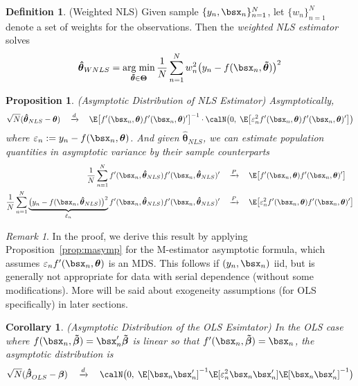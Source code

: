 \documentclass[12pt]{article}
\theoremstyle{plain}
\newtheorem{prop}[thm]{Proposition}
\newtheorem{cor}[thm]{Corollary}
\theoremstyle{definition}
\newtheorem{defn}[thm]{Definition}
\theoremstyle{remark}
\newtheorem*{rmk}{Remark}
\newcommand{\bstheta}{\boldsymbol{\theta}}
\newcommand{\bsTheta}{\boldsymbol{\Theta}}
\newcommand{\bsbeta}{\boldsymbol{\beta}}
\newcommand{\bshatbeta}{\boldsymbol{\hat{\beta}}}
\newcommand{\bshattheta}{\boldsymbol{\hat{\theta}}}
\newcommand{\bstildebeta}{\boldsymbol{\tilde{\beta}}}
\newcommand{\bstildetheta}{\boldsymbol{\tilde{\theta}}}
\DeclareMathOperator*{\argmin}{arg\;min}
\newcommand{\Var}{\operatorname{Var}}
\newcommand{\pto}{\xrightarrow{P}}
\newcommand{\dto}{\xrightarrow{d}}
\newcommand{\sumnN}{\sum^N_{n=1}}
\newcommand{\nN}{_{n=1}^N}
\begin{document}
\begin{defn}(Weighted NLS)
Given sample $\{y_n,\bsx_n\}\nN$, let $\{w_n\}\nN$ denote a set of
weights for the observations. Then the \emph{weighted NLS estimator}
solves
\begin{align}
  \bshattheta_{WNLS}
  = \argmin_{\bstildetheta\in\bsTheta}
  \frac{1}{N}\sumnN w_n^2\big(y_n-f(\bsx_n,\bstildetheta)\big)^2
  \label{wnls}
\end{align}
\end{defn}


\begin{prop}\emph{(Asymptotic Distribution of NLS Estimator)}
\label{prop:nls}
Asymptotically,
\begin{align*}
  \sqrt{N}(\bshattheta_{NLS}-\bstheta)
  \quad\dto\quad
  \E\big[
  f'(\bsx_n,\bstheta)f'(\bsx_n,\bstheta)'
  \big]^{-1}
  \cdot
  \calN\big(0,\;
  \E\big[\varepsilon_n^2f'(\bsx_n,\bstheta)f'(\bsx_n,\bstheta)'\big]
  \big)
\end{align*}
where $\varepsilon_n:=y_n-f(\bsx_n,\bstheta)$.
And given $\bshattheta_{NLS}$, we can estimate population quantities in
asymptotic variance by their sample counterparts
\begin{align*}
  \frac{1}{N}\sumnN
  f'(\bsx_n,\bshattheta_{NLS})f'(\bsx_n,\bshattheta_{NLS})'
  \quad&\pto\quad
  \E\big[
  f'(\bsx_n,\bstheta)f'(\bsx_n,\bstheta)'
  \big]
  \\
  \frac{1}{N}\sumnN
  \underbrace{%
  \big(y_n-f(\bsx_n,\bshattheta_{NLS})\big)^2
  }_{\hat{\varepsilon}_n}
  f'(\bsx_n,\bshattheta_{NLS})f'(\bsx_n,\bshattheta_{NLS})'
  \quad&\pto\quad
  \E\big[\varepsilon_n^2
  f'(\bsx_n,\bstheta)f'(\bsx_n,\bstheta)'
  \big]
  \notag
\end{align*}
\end{prop}
\begin{rmk}
In the proof, we derive this result by applying
Proposition~\ref{prop:masymp} for the M-estimator asymptotic formula,
which assumes $\varepsilon_nf'(\bsx_n,\bstheta)$ is an MDS.
This follows if $(y_n,\bsx_n)$ iid, but is generally not appropriate for
data with serial dependence (without some modifications).
More will be said about exogeneity assumptions (for OLS specifically) in
later sections.
\end{rmk}
\begin{cor}\emph{(Asymptotic Distribution of the OLS Esimtator)}
In the OLS case where $f(\bsx_n,\bstildebeta)=\bsx_n'\bstildebeta$
is linear so that $f'(\bsx_n,\bstildebeta)=\bsx_n$, the
asymptotic distribution is
\begin{align*}
  \sqrt{N}(\bshatbeta_{OLS}-\bsbeta)
  \quad\dto\quad
  \calN\big(0,\;
  \E[ \bsx_n\bsx_n' ]^{-1}
  \E[\varepsilon_n^2 \bsx_n\bsx_n' ]
  \E[ \bsx_n\bsx_n' ]^{-1}
  \big)
\end{align*}
\end{cor}
\end{document}

